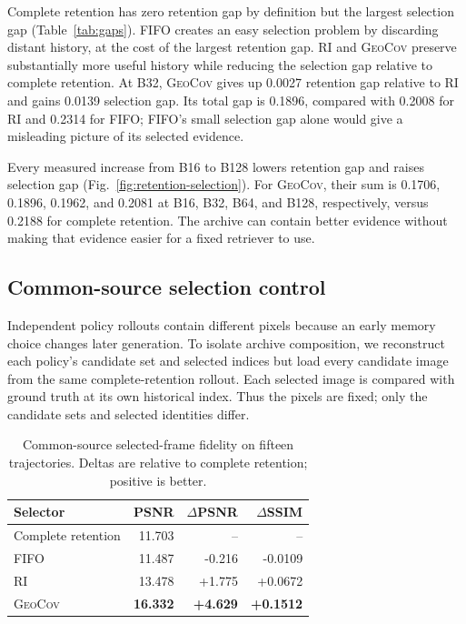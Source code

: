 \documentclass[10pt,twocolumn]{article}
\newcommand{\Geo}{\textsc{GeoCov}\xspace}
\newcommand{\RI}{\textsc{RI}\xspace}
\begin{document}
Complete retention has zero retention gap by definition but the largest
selection gap (Table~\ref{tab:gaps}). FIFO creates an easy selection problem by
discarding distant history, at the cost of the largest retention gap. \RI and
\Geo preserve substantially more useful history while reducing the selection
gap relative to complete retention. At B32, \Geo gives up 0.0027 retention gap
relative to \RI and gains 0.0139 selection gap. Its total gap is 0.1896,
compared with 0.2008 for \RI and 0.2314 for FIFO; FIFO's small selection
gap alone would give a misleading picture of its selected evidence.

Every measured increase from B16 to B128 lowers retention gap and raises
selection gap (Fig.~\ref{fig:retention-selection}). For \Geo, their sum is
0.1706, 0.1896, 0.1962, and 0.2081 at B16, B32, B64, and B128, respectively,
versus 0.2188 for complete retention. The archive can contain better evidence
without making that evidence easier for a fixed retriever to use.

\subsection{Common-source selection control}
\label{sec:common-source}

Independent policy rollouts contain different pixels because an early memory
choice changes later generation. To isolate archive composition, we reconstruct
each policy's candidate set and selected indices but load every candidate image
from the same complete-retention rollout. Each selected image is compared with
ground truth at its own historical index. Thus the pixels are fixed; only the
candidate sets and selected identities differ.

\begin{table}[!htbp]
\centering
\caption{Common-source selected-frame fidelity on fifteen trajectories.
Deltas are relative to complete retention; positive is better.}
\label{tab:common-source}
\small
\begin{tabular}{lrrr}
\toprule
Selector & PSNR & $\Delta$PSNR & $\Delta$SSIM \\
\midrule
Complete retention & 11.703 & -- & -- \\
FIFO & 11.487 & -0.216 & -0.0109 \\
\RI & 13.478 & +1.775 & +0.0672 \\
\Geo & \textbf{16.332} & \textbf{+4.629} & \textbf{+0.1512} \\
\bottomrule
\end{tabular}
\end{table}
\end{document}
